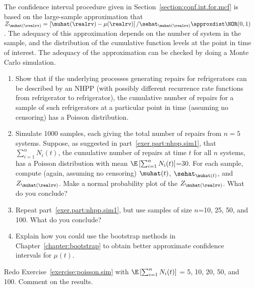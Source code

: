 \begin{exercise2}
\label{exercise:poisson.sim}
The confidence interval procedure
given in Section~\ref{section:conf.int.for.mcf} is based on the
large-sample approximation that $Z_{\muhat(\realrv)} =
\left [\muhat(\realrv)-\mu(\realrv) \right ]/\sehat_{\muhat(\realrv)} 
\approxdist \NOR(0,1)$. The adequacy of this approximation 
depends on the number of system in the sample, and the distribution of
the cumulative function levels at the point in time of interest. The
adequacy of the approximation can be checked by doing a Monte Carlo
simulation.
\begin{enumerate}
\item
\label{exer.part:nhpp.sim1}
Show that if the underlying processes generating repairs for
refrigerators can be described by an NHPP (with possibly different
recurrence rate functions from refrigerator to refrigerator), the
cumulative number of repairs for a sample of such refrigerators at a
particular point in time (assuming no censoring) has a Poisson
distribution.
\item
Simulate 1000 samples, each giving the total number of repairs from
$n=5$ systems. Suppose, as suggested in
part~\ref{exer.part:nhpp.sim1}, that $\sum_{i=1}^{n} N_{i}(t)$, the
cumulative number of repairs at time $t$ for all $n$ systems, has a
Poisson distribution with mean $\E \left [ \sum_{i=1}^{n} N_{i}(t)
\right ]$=30.  For each sample, compute (again, assuming no
censoring) $\muhat(t)$, $\sehat_{\muhat(t)}$, and
$Z_{\muhat(\realrv)}$. Make a normal probability plot of the
$Z_{\muhat(\realrv)}$. What do you conclude?
\item
Repeat part~\ref{exer.part:nhpp.sim1}, but use samples of size $n$=10,
25, 50, and 100. What do you conclude?
\item
Explain how you could use the bootstrap methods in
Chapter~\ref{chapter:bootstrap}
to obtain better  approximate confidence intervals for $\mu(t)$.
\end{enumerate}
\end{exercise2}

\begin{exercise2}
Redo Exercise~\ref{exercise:poisson.sim} with $\E \left[ \sum_{i=1}^{n}
N_{i}(t) \right]$ = 5, 10, 20, 50, and 100. Comment on the results.
\end{exercise2}

